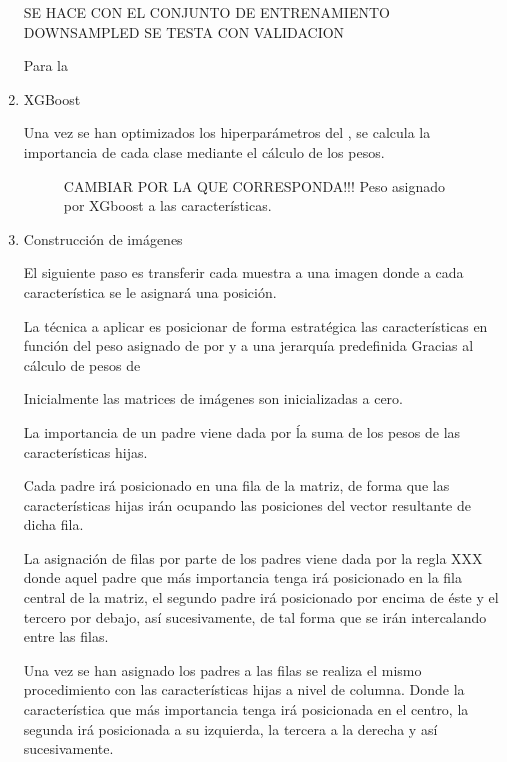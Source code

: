\begin{enumerate}
            SE HACE CON EL CONJUNTO DE ENTRENAMIENTO DOWNSAMPLED
            SE TESTA CON VALIDACION

            Para la 

        \item XGBoost


            Una vez se han optimizados los hiperparámetros del , se calcula la importancia de cada clase mediante el cálculo de los pesos.


            \begin{figure}[h]
                \centering
                
                \caption{CAMBIAR POR LA QUE CORRESPONDA!!! Peso asignado por XGboost a las características.}
                \label{FeatureWeightsImage}
             \end{figure}

        \item Construcción de imágenes


            El siguiente paso es transferir cada muestra a una imagen donde a cada característica se le asignará una posición.

            La técnica a aplicar es posicionar de forma estratégica las características en función del peso asignado de por  y a una jerarquía predefinida
            Gracias al cálculo de pesos de  \ \cite{TASPCNN}


            Inicialmente las matrices de imágenes son inicializadas a cero.

            La importancia de un padre viene dada por ĺa suma de los pesos de las características hijas.

            Cada padre irá posicionado en una fila de la matriz, de forma que las características hijas irán ocupando las posiciones del vector resultante de dicha fila.

            La asignación de filas por parte de los padres viene dada por la regla XXX donde aquel padre que más importancia tenga irá posicionado en la fila central de la matriz, el segundo padre irá posicionado por encima de éste y el tercero por debajo, así sucesivamente, de tal forma que se irán intercalando entre las filas.


            Una vez se han asignado los padres a las filas se realiza el mismo procedimiento con las características hijas a nivel de columna. Donde la característica que más importancia tenga irá posicionada en el centro, la segunda irá posicionada a su izquierda, la tercera a la derecha y así sucesivamente.


\end{enumerate}
